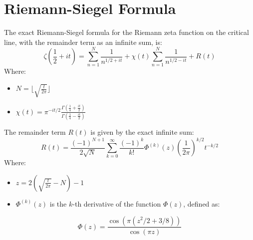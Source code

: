 \documentclass{article}
\begin{document}
\section*{Riemann-Siegel Formula}
The exact Riemann-Siegel formula for the Riemann zeta function on the critical line, with the remainder term as an infinite sum, is:
\begin{equation}
\zeta(\frac{1}{2} + it) = \sum_{n=1}^N \frac{1}{n^{1/2 + it}} + \chi(t) \sum_{n=1}^N \frac{1}{n^{1/2 - it}} + R(t)
\end{equation}
Where:
\begin{itemize}
\item $N = \lfloor\sqrt{\frac{t}{2\pi}}\rfloor$
\item $\chi(t) = \pi^{-it/2} \frac{\Gamma(\frac{1}{4} + \frac{it}{2})}{\Gamma(\frac{1}{4} - \frac{it}{2})}$
\end{itemize}
The remainder term $R(t)$ is given by the exact infinite sum:
\begin{equation}
R(t) = \frac{(-1)^{N+1}}{2\sqrt{N}} \sum_{k=0}^{\infty} \frac{(-1)^k}{k!} \Phi^{(k)}(z) \left(\frac{1}{2\pi}\right)^{k/2} t^{-k/2}
\end{equation}
Where:
\begin{itemize}
\item $z = 2(\sqrt{\frac{t}{2\pi}} - N) - 1$
\item $\Phi^{(k)}(z)$ is the $k$-th derivative of the function $\Phi(z)$, defined as:
\end{itemize}
\begin{equation}
\Phi(z) = \frac{\cos(\pi(z^2/2 + 3/8))}{\cos(\pi z)}
\end{equation}
\end{document}
